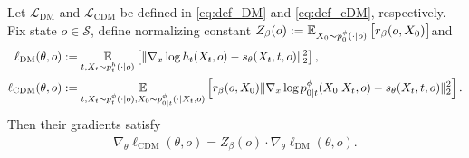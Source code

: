 \begin{theorem}
\label{thm:grad_equi_re}
    Let $\mathcal{L}_{\mathrm{DM}}$ and $\mathcal{L}_{\mathrm{CDM}}$ be defined in \eqref{eq:def_DM} and \eqref{eq:def_cDM}, respectively.
Fix state $o \in\mathcal S$, define normalizing constant
$Z_{\beta}(o) := \operatorname*{{\mathbb{E}}}_{X_0 \sim p_0^\phi(\cdot|o)}\big[r_\beta(o,X_0)\big]$and 
\begin{align*}
    \ell_{\mathrm{DM}}(\theta,o)
    &:=
    \operatorname*{{\mathbb{E}}}_{t,X_t\sim p_t^h(\cdot|o)}
    \left[
        \|
        \nabla_x\log h_t(X_t,o)-s_\theta(X_t,t,o)
        \|_2^2
    \right],
    \\
    \ell_{\mathrm{CDM}}(\theta,o)
    &:=
    \operatorname*{{\mathbb{E}}}_{t,X_t\sim p_t^\phi(\cdot|o),X_0\sim p_{0|t}^\phi(\cdot|X_t,o)}
    \left[
        r_\beta(o,X_0)
        \|
        \nabla_x\log p_{0|t}^\phi(X_0|X_t,o)
        -
        s_\theta(X_t,t,o)
        \|_2^2
    \right].
\end{align*}
Then their gradients satisfy
\begin{align*}
    \nabla_\theta \ell_{\mathrm{CDM}}(\theta,o)
    =
    Z_{\beta}(o) \cdot \nabla_\theta \ell_{\mathrm{DM}}(\theta,o).
\end{align*}
\end{theorem}


